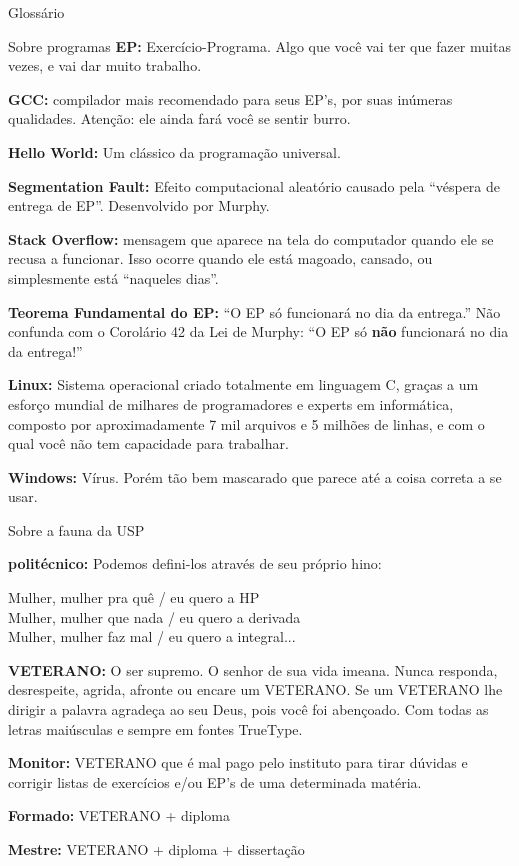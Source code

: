 \begin{secao}{Glossário}
\begin{subsecao}{Sobre programas}
{\bf EP:} Exercício-Programa. Algo que você vai ter que fazer muitas vezes, e
vai dar muito trabalho.

{\bf GCC:} compilador mais recomendado para seus EP's, por suas inúmeras
qualidades. Atenção: ele ainda fará você se sentir burro.

{\bf Hello World:} Um clássico da programação universal.

{\bf Segmentation Fault:} Efeito computacional aleatório causado pela ``véspera
de entrega de EP''. Desenvolvido por Murphy.

{\bf Stack Overflow:} mensagem que aparece na tela do computador
quando ele se recusa a funcionar. Isso ocorre quando ele está magoado, cansado,
ou simplesmente está ``naqueles dias''.

{\bf Teorema Fundamental do EP:} ``O EP só funcionará no dia da entrega.'' Não
confunda com o Corolário 42 da Lei de Murphy: ``O EP só {\bf não} funcionará no
dia da entrega!''

{\bf Linux:} Sistema operacional criado totalmente em linguagem C, graças a um
esforço mundial de milhares de programadores e experts em informática, composto
por aproximadamente 7 mil arquivos e 5 milhões de linhas, e com o qual você não
tem capacidade para trabalhar.

{\bf Windows:} Vírus. Porém tão bem mascarado que parece até a coisa correta a
se usar.
\end{subsecao}

\begin{subsecao}{Sobre a fauna da USP}

{\bf politécnico:} Podemos defini-los através de seu próprio hino: 

Mulher, mulher pra quê / eu quero a HP\\
Mulher, mulher que nada / eu quero a derivada\\
Mulher, mulher faz mal / eu quero a integral...

{\bf VETERANO:} O ser supremo. O senhor de sua vida imeana. Nunca responda,
desrespeite, agrida, afronte ou encare um VETERANO. Se um VETERANO lhe dirigir
a palavra agradeça ao seu Deus, pois você foi abençoado. Com todas as letras
maiúsculas e sempre em fontes TrueType.

{\bf Monitor:} VETERANO que é mal pago pelo instituto para tirar dúvidas e
corrigir listas de exercícios e/ou EP's de uma determinada matéria.

{\bf Formado:} VETERANO + diploma

{\bf Mestre:} VETERANO + diploma + dissertação


\end{subsecao}
\end{secao}
